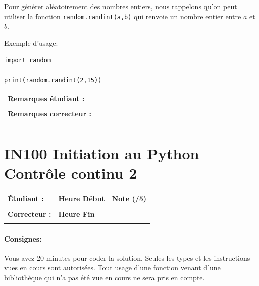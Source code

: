 \documentclass[a4paper,11pt]{article}
\begin{document}
Pour générer aléatoirement des nombres entiers, nous rappelons qu'on peut utiliser la fonction \texttt{random.randint(a,b)} qui renvoie un nombre entier entre $a$ et $b$. 

\vspace{0.2 cm}
Exemple d'usage:
\vspace{-0.2 cm}
\begin{verbatim}
import random

print(random.randint(2,15))
\end{verbatim}

\vspace{-0.4 cm}
\begin{table}[h!]
\centering
\renewcommand{\arraystretch}{1.4} %
\begin{tabular}{|p{15cm}|}
\hline
\textbf{Remarques étudiant :}    \\
 \\
\hline
\textbf{Remarques correcteur :}  \\
 \\
\hline
\end{tabular}
\end{table}


\newpage


\section*{\center IN100 Initiation au Python\\
Contrôle continu 2}


\begin{table}[h!]
\centering
\renewcommand{\arraystretch}{1.4} %
\begin{tabular}{|p{10cm}|p{3cm}|p{2cm}|}
\hline
\textbf{Étudiant :} & \textbf{Heure Début }  & \textbf{Note (/5) }  \\
& & \\
\hline
\textbf{Correcteur :} & \textbf{Heure Fin } & \\
& & \\
\hline

\hline
\end{tabular}
\end{table}

\paragraph*{Consignes:} Vous avez 20 minutes pour coder la solution. Seules les types et les instructions vues en cours sont autorisées. Tout usage d'une fonction 
venant d'une bibliothèque qui n'a pas été vue en cours ne sera pris en compte. 
\end{document}
